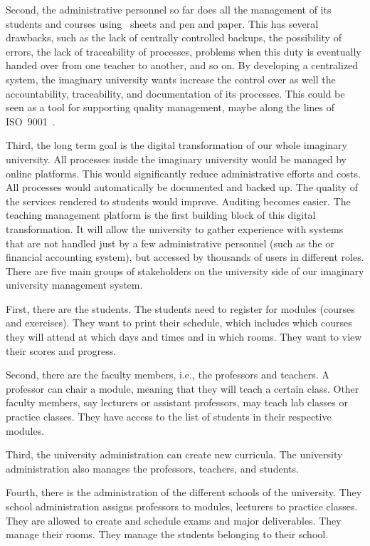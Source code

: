 Second, the administrative personnel so far does all the management of its students and courses using \microsoftExcel\ sheets and pen and paper.
This has several drawbacks, such as the lack of centrally controlled backups, the possibility of errors, the lack of traceability of processes, problems when this duty is eventually handed over from one teacher to another, and so on.
By developing a centralized system, the imaginary university wants increase the control over as well the accountability, traceability, and documentation of its processes.
This could be seen as a tool for supporting quality management, maybe along the lines of ISO~9001~\cite{ISO180912019,ISO90012015}.

Third, the long term goal is the digital transformation of our whole imaginary university.
All processes inside the imaginary university would be managed by online platforms.
This would significantly reduce administrative efforts and costs.
All processes would automatically be documented and backed up.
The quality of the services rendered to students would improve.
Auditing becomes easier.
The teaching management platform is the first building block of this digital transformation.
It will allow the university to gather experience with systems that are not handled just by a few administrative personnel (such as the  or financial accounting system), but accessed by thousands of users in different roles.%
%
\endhsection%
%
%
%
There are five main groups of stakeholders on the university side of our imaginary university management system.

First, there are the students.
The students need to register for modules (courses and exercises).
They want to print their schedule, which includes which courses they will attend at which days and times and in which rooms.
They want to view their scores and progress.

Second, there are the faculty members, i.e., the professors and teachers.
A professor can chair a module, meaning that they will teach a certain class.
Other faculty members, say lecturers or assistant professors, may teach lab classes or practice classes.
They have access to the list of students in their respective modules.

Third, the university administration can create new curricula.
The university administration also manages the professors, teachers, and students.

Fourth, there is the administration of the different schools of the university.
They school administration assigns professors to modules, lecturers to practice classes.
They are allowed to create and schedule exams and major deliverables.
They manage their rooms.
They manage the students belonging to their school.

